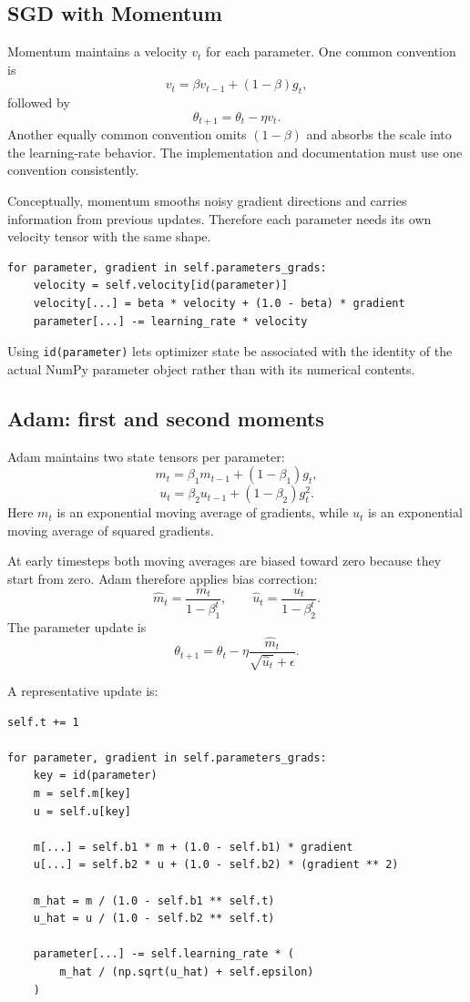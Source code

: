 \documentclass[11pt,a4paper]{article}
\newcommand{\code}[1]{\texttt{#1}}
\begin{document}
\subsection{SGD with Momentum}

Momentum maintains a velocity $v_t$ for each parameter. One common convention is
\[
v_t=\beta v_{t-1}+(1-\beta)g_t,
\]
followed by
\[
\theta_{t+1}=\theta_t-\eta v_t.
\]
Another equally common convention omits $(1-\beta)$ and absorbs the scale into the learning-rate behavior. The implementation and documentation must use one convention consistently.

Conceptually, momentum smooths noisy gradient directions and carries information from previous updates. Therefore each parameter needs its own velocity tensor with the same shape.

\begin{lstlisting}
for parameter, gradient in self.parameters_grads:
    velocity = self.velocity[id(parameter)]
    velocity[...] = beta * velocity + (1.0 - beta) * gradient
    parameter[...] -= learning_rate * velocity
\end{lstlisting}

Using \code{id(parameter)} lets optimizer state be associated with the identity of the actual NumPy parameter object rather than with its numerical contents.

\subsection{Adam: first and second moments}

Adam maintains two state tensors per parameter:
\[
m_t=\beta_1m_{t-1}+(1-\beta_1)g_t,
\]
\[
u_t=\beta_2u_{t-1}+(1-\beta_2)g_t^2.
\]
Here $m_t$ is an exponential moving average of gradients, while $u_t$ is an exponential moving average of squared gradients.

At early timesteps both moving averages are biased toward zero because they start from zero. Adam therefore applies bias correction:
\[
\hat m_t=\frac{m_t}{1-\beta_1^t},
\qquad
\hat u_t=\frac{u_t}{1-\beta_2^t}.
\]
The parameter update is
\[
\boxed{
\theta_{t+1}
=
\theta_t
-
\eta
\frac{\hat m_t}{\sqrt{\hat u_t}+\epsilon}
}.
\]

A representative update is:
\begin{lstlisting}
self.t += 1

for parameter, gradient in self.parameters_grads:
    key = id(parameter)
    m = self.m[key]
    u = self.u[key]

    m[...] = self.b1 * m + (1.0 - self.b1) * gradient
    u[...] = self.b2 * u + (1.0 - self.b2) * (gradient ** 2)

    m_hat = m / (1.0 - self.b1 ** self.t)
    u_hat = u / (1.0 - self.b2 ** self.t)

    parameter[...] -= self.learning_rate * (
        m_hat / (np.sqrt(u_hat) + self.epsilon)
    )
\end{lstlisting}
\end{document}

